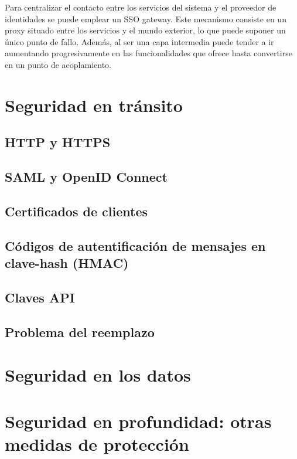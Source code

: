 \documentclass[11pt,a4paper]{article}
\begin{document}
Para centralizar el contacto entre los servicios del sistema y el proveedor de identidades se puede emplear un SSO gateway. Este mecanismo consiste en un proxy situado entre los servicios y el mundo exterior, lo que puede suponer un único punto de fallo. Además, al ser una capa intermedia puede tender a ir aumentando progresivamente en las funcionalidades que ofrece hasta convertirse en un punto de acoplamiento.

\section{Seguridad en tránsito}

\subsection{HTTP y HTTPS}

\subsection{SAML y OpenID Connect}

\subsection{Certificados de clientes}

\subsection{Códigos de autentificación de mensajes en clave-hash (HMAC)}

\subsection{Claves API}

\subsection{Problema del reemplazo}

\section{Seguridad en los datos}

\section{Seguridad en profundidad: otras medidas de protección}
\end{document}
